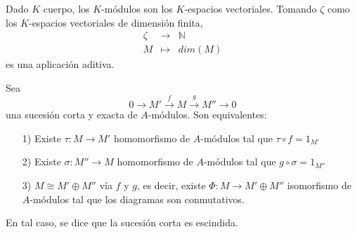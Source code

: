 \documentclass[../main.tex]{subfiles}
\begin{document}
\begin{example} Dado $K$ cuerpo, los $K$-módulos son los $K$-espacios vectoriales. Tomando $\zeta$ como los $K$-espacios vectoriales de dimensión finita,
	$$\begin{array}{rcl}
	\zeta&\longrightarrow&\mathbb{N}\\
	M&\longmapsto&dim(M)
	\end{array}$$
	es una aplicación aditiva.
\end{example}
\begin{proposition}\label{esc} Sea$$0\longrightarrow M'\overset{f}{\longrightarrow} M\overset{g}{\longrightarrow} M''\longrightarrow 0$$ una sucesión corta y exacta de $A$-módulos. Son equivalentes:
	\begin{itemize}
		\item [1)] Existe $\tau:M\longrightarrow M'$ homomorfismo de $A$-módulos tal que $\tau\circ f=1_{M'}$
		\item[2)] Existe $\sigma:M''\longrightarrow M$ homomorfismo de $A$-módulos tal que $g\circ\sigma=1_{M''}$
		\item[3)] $M\cong M'\oplus M''$ vía $f$ y $g$, es decir, existe $\Phi:M\longrightarrow M'\oplus M''$ isomorfismo de $A$-módulos tal que los diagramas son conmutativos.
	\end{itemize}
	En tal caso, se dice que la sucesión corta es escindida.
\end{proposition}
\end{document}

